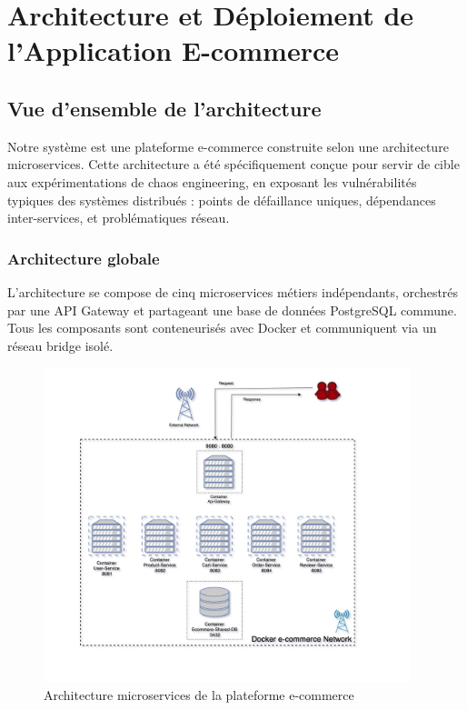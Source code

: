 \chapter{Architecture et Déploiement de l'Application E-commerce}

\section{Vue d'ensemble de l'architecture}

Notre système est une plateforme e-commerce construite selon une architecture microservices. Cette architecture a été spécifiquement conçue pour servir de cible aux expérimentations de chaos engineering, en exposant les vulnérabilités typiques des systèmes distribués : points de défaillance uniques, dépendances inter-services, et problématiques réseau.

\subsection{Architecture globale}

L'architecture se compose de cinq microservices métiers indépendants, orchestrés par une API Gateway et partageant une base de données PostgreSQL commune. Tous les composants sont conteneurisés avec Docker et communiquent via un réseau bridge isolé.

\begin{figure}[H]
\centering
\includegraphics[width=0.95\textwidth]{images/arch-1.jpeg}
\caption{Architecture microservices de la plateforme e-commerce}
\label{fig:architecture-overview}
\end{figure}

